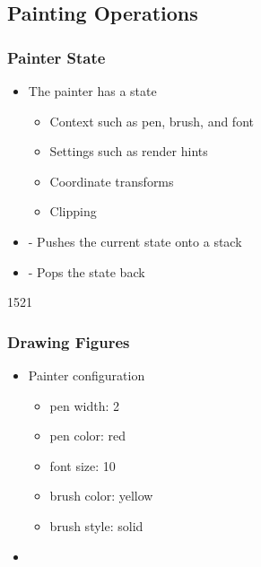 %
%
%
%

\subsection{Painting Operations}

\begin{slide}\frametitle{Painter State}
\begin{itemize}
\item The painter has a state
  \begin{itemize}
  \item Context such as pen, brush, and font
  \item Settings such as render hints
  \item Coordinate transforms
  \item Clipping
  \end{itemize}
\item {} - Pushes the current state onto a stack
\item {} - Pops the state back
\end{itemize}
\end{slide}                             


\begin{slide}{1521}\frametitle{Drawing Figures}
\begin{itemize}
\item Painter configuration
  \begin{itemize}
  \item pen width: 2
  \item pen color: red
  \item font size: 10
  \item brush color: yellow
  \item brush style: solid
  \end{itemize}

\item {}
\end{itemize}
\end{slide}                             


